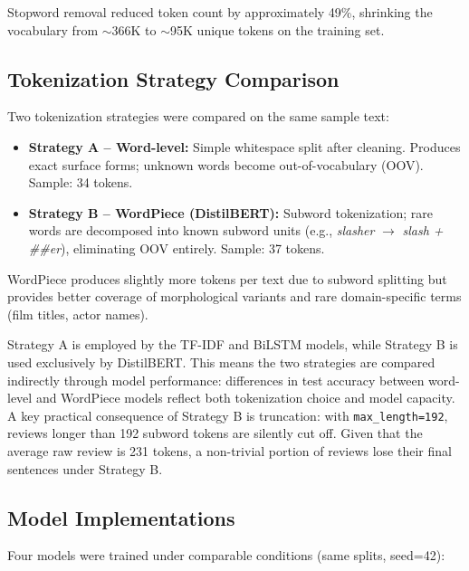 \documentclass[11pt,a4paper]{article}
\begin{document}
Stopword removal reduced token count by approximately 49\%, shrinking the vocabulary from $\sim$366K to $\sim$95K unique tokens on the training set.

\subsection{Tokenization Strategy Comparison}

Two tokenization strategies were compared on the same sample text:

\begin{itemize}
    \item \textbf{Strategy A -- Word-level:} Simple whitespace split after cleaning. Produces exact surface forms; unknown words become out-of-vocabulary (OOV). Sample: 34 tokens.
    \item \textbf{Strategy B -- WordPiece (DistilBERT):} Subword tokenization; rare words are decomposed into known subword units (e.g., \textit{slasher} $\to$ \textit{slash + \#\#er}), eliminating OOV entirely. Sample: 37 tokens.
\end{itemize}

WordPiece produces slightly more tokens per text due to subword splitting but provides better coverage of morphological variants and rare domain-specific terms (film titles, actor names).

Strategy A is employed by the TF-IDF and BiLSTM models, while Strategy B is used exclusively by DistilBERT. This means the two strategies are compared indirectly through model performance: differences in test accuracy between word-level and WordPiece models reflect both tokenization choice and model capacity. A key practical consequence of Strategy B is truncation: with \texttt{max\_length=192}, reviews longer than 192 subword tokens are silently cut off. Given that the average raw review is 231 tokens, a non-trivial portion of reviews lose their final sentences under Strategy B.

\subsection{Model Implementations}

Four models were trained under comparable conditions (same splits, seed=42):
\end{document}

